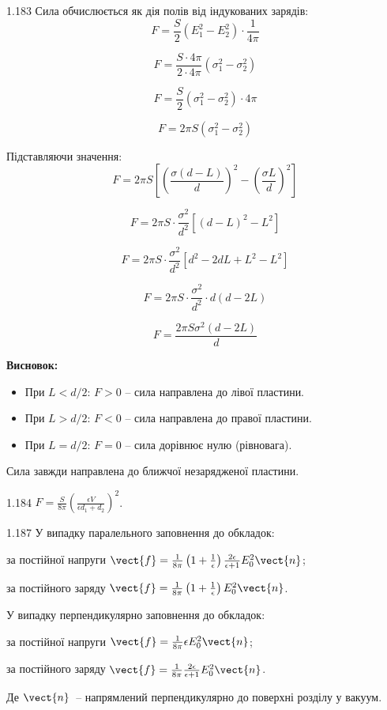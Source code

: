 \begin{Solution}{1.{183}}
Сила обчислюється як дія полів від індукованих зарядів:
$$F = \frac{S}{2}(E_1^2 - E_2^2) \cdot \frac{1}{4\pi}$$

$$F = \frac{S \cdot 4\pi}{2 \cdot 4\pi}(\sigma_1^2 - \sigma_2^2)$$

$$F = \frac{S}{2}(\sigma_1^2 - \sigma_2^2) \cdot 4\pi$$

$$F = 2\pi S(\sigma_1^2 - \sigma_2^2)$$

Підставляючи значення:
$$F = 2\pi S\left[\left(\frac{\sigma(d-L)}{d}\right)^2 - \left(\frac{\sigma L}{d}\right)^2\right]$$

$$F = 2\pi S \cdot \frac{\sigma^2}{d^2}[(d-L)^2 - L^2]$$

$$F = 2\pi S \cdot \frac{\sigma^2}{d^2}[d^2 - 2dL + L^2 - L^2]$$

$$F = 2\pi S \cdot \frac{\sigma^2}{d^2} \cdot d(d - 2L)$$

$$F = \frac{2\pi S\sigma^2(d - 2L)}{d}$$

\textbf{Висновок:}
\begin{itemize}
    \item При $L < d/2$: $F > 0$ -- сила направлена до лівої пластини.
    \item При $L > d/2$: $F < 0$ -- сила направлена до правої пластини.
    \item При $L = d/2$: $F = 0$ -- сила дорівнює нулю (рівновага).
\end{itemize}

Сила завжди направлена до ближчої незарядженої пластини.
\end{Solution}
\begin{Solution}{1.{184}}
	$ F = \frac{S}{8\pi} \left( \frac{\epsilon V}{ \epsilon d_1 + d_2} \right)^2 $.
\end{Solution}
\begin{Solution}{1.{187}}
		У випадку паралельного заповнення до обкладок:
		\begin{enumerate*}[label=\alph*)]
			\item за постійної напруги
			$\vect{f} = \frac{1}{8\pi}\left( 1+\frac1\epsilon\right) \frac{2\epsilon}{\epsilon + 1} E_0^2 \vect{n}$;
			\item за постійного заряду
			$\vect{f} = \frac{1}{8\pi}\left( 1+\frac1\epsilon\right) E_0^2 \vect{n}$.
		\end{enumerate*}
		У випадку перпендикулярно заповнення до обкладок:
		\begin{enumerate*}[label=\alph*)]
			\item за постійної напруги
			$\vect{f} = \frac{1}{8\pi}\epsilon E_0^2 \vect{n}$;
			\item за постійного заряду
			$\vect{f} = \frac{1}{8\pi} \frac{2\epsilon }{\epsilon + 1} E_0^2 \vect{n}$.
		\end{enumerate*}
		Де $\vect{n}$~-- напрямлений перпендикулярно до поверхні розділу у вакуум.
	
\end{Solution}
